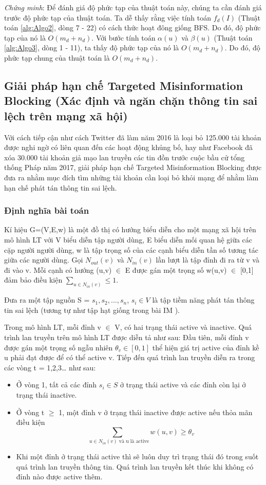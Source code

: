  	{\itshape Chứng minh}: Để đánh giá độ phức tạp của thuật toán này, chúng ta cần đánh giá trước độ phức tạp của thuật toán. Ta dễ thấy rằng việc tính  toán $f_{d}(I)$ (Thuật toán \ref{alg:Algo2}, dòng 7 - 22) có cách thức hoạt đông giống BFS. Do đó, độ phức tạp của nó là $O(m_{d} + n_{d})$. Với bước tính toán $\alpha(u)$ và $\beta(u)$ (Thuật toán \ref{alg:Algo3}, dòng 1 - 11), ta thấy độ phức tạp của nó là $O(m_{d} + n_{d})$. Do đó, độ phức tạp chung của thuật toán là $O(m_{d} + n_{d})$. 
		
	\subsection{Giải pháp hạn chế Targeted Misinformation Blocking (Xác định và ngăn chặn thông tin sai lệch trên mạng xã hội)}
Với cách tiếp cận như cách Twitter đã làm năm 2016 là loại bỏ 125.000 tài khoản được nghi ngờ có liên quan đến các hoạt động khủng bố, hay như Facebook đã xóa 30.000 tài khoản giả mạo lan truyền các tin đồn trước cuộc bầu cử tổng thống Pháp năm 2017, giải pháp hạn chế Targeted Misinformation Blocking được đưa ra nhằm mục đích tìm những tài khoản cần loại bỏ khỏi mạng để nhằm làm hạn chế phát tán thông tin sai lệch.

\subsubsection{Định nghĩa bài toán}
Kí hiệu G=(V,E,w) là một đồ thị có hướng biểu diễn cho một mạng xã hội trên mô hình LT với V biểu diễn tập người dùng, E biểu diễn mối quan hệ giữa các cặp người người dùng, w là tập trọng số của các cạnh biểu diễn tần số tương tác giữa các người dùng. Gọi $N_{out}(v)$ và $N_{in}(v)$ lần lượt là tập đỉnh đi ra từ v và đi vào v. Mỗi cạnh có hướng (u,v) $\in$ E được gán một trọng số w(u,v) $\in$ [0,1] đảm bảo điều kiện $\sum_{u \in N_{in}(v)} \leq 1$.

Đưa ra một tập nguồn S = {$s_{1}, s_{2}, ... , s_{n}$}, $s_{i} \in V$ là tập tiềm năng phát tán thông tin sai lệch (tương tự như tập hạt giống trong bài IM \cite{kemple2}).

Trong mô hình LT, mỗi đỉnh v $\in$ V, có hai trạng thái active và inactive. Quá trình lan truyền trên mô hình LT được diễn tả như sau: Đầu tiên, mỗi đỉnh v được gán một trọng số ngẫu nhiên $\theta_{v} \in [0,1]$ thể hiện giá trị active của đỉnh kề u phải đạt được để có thể active v. Tiếp đến quá trình lan truyền diễn ra trong các vòng t = 1,2,3… như sau: 		
\begin {itemize}
\item Ở vòng 1, tất cả các đỉnh $s_{i} \in S$ ở trạng thái active và các đỉnh còn lại ở trạng thái inactive.

\item Ở vòng t $\ge$ 1, một đỉnh v ở trạng thái inactive được active nếu thỏa mãn điều kiện $$\sum_{\mbox{ $u \in N_{in}(v) $ và  u  là active}} w(u, v)\geq \theta_v$$

\item Khi một đỉnh ở trạng thái active thì sẽ luôn duy trì trạng thái đó trong suốt quá trình lan truyền thông tin. Quá trình lan truyền kết thúc khi không có đỉnh nào được active thêm.	
\end {itemize}


